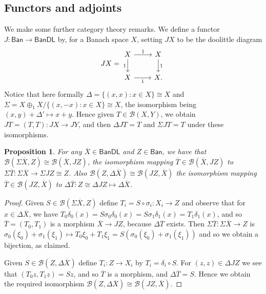 \documentclass[a4paper,11pt]{article}
\theoremstyle{plain}
\newtheorem{proposition}{Proposition}[section]
\theoremstyle{remark}
\newcommand{\mc}[1]{\mathcal{#1}}
\newcommand{\msf}[1]{\mathsf{#1}}
\begin{document}
\subsection{Functors and adjoints}\label{sec:functors_adjoints}

We make some further category theory remarks.  We define a functor $J\colon \msf{Ban} \to \msf{BanDL}$ by, for a Banach space $X$, setting $JX$ to be the doolittle diagram
\[ JX = \begin{tikzcd}
X \arrow[r, "1"] \arrow[d, "1"'] & X \arrow[d, "1"] \\
X \arrow[r, "1"'] & X.
\end{tikzcd} \]
Notice that here formally $\Delta = \{ (x,x) : x\in X \} \cong X$ and $\Sigma = X\oplus_1 X / \{ (x,-x) : x\in X \} \cong X$, the isomorphism being $(x,y) +\Delta' \mapsto x+y$.  Hence given $T\in\mc B(X,Y)$, we obtain $JT =(T,T) \colon JX \to JY$, and then $\Delta JT = T$ and $\Sigma JT = T$ under these isomorphisms.

\begin{proposition}\label{prop:J_hom_space_adjoints}
For any $\overline X\in\msf{BanDL}$ and $Z\in\msf{Ban}$, we have that $\mc B(\Sigma\overline X, Z) \cong \mc B(\overline X, JZ)$, the isomorphism mapping $\overline T\in\mc B(\overline X, JZ)$ to $\Sigma\overline T \colon \Sigma\overline X \to \Sigma JZ\cong Z$.  Also $\mc B(Z, \Delta\overline X) \cong \mc B(JZ, \overline X)$ the isomorphism mapping $\overline T \in \mc B(JZ, \overline X)$ to $\Delta\overline T \colon Z \cong \Delta JZ \mapsto \Delta\overline X$.
\end{proposition}
\begin{proof}
Given $S\in\mc B(\Sigma\overline X, Z)$ define $T_i = S\circ \sigma_i \colon X_i \to Z$ and observe that for $x\in\Delta\overline X$, we have $T_0\delta_0(x) = S \sigma_0\delta_0(x) = S\sigma_1\delta_1(x) = T_1\delta_1(x)$, and so $\overline T=(T_0,T_1)$ is a morphism $\overline X \to JZ$, because $\Delta\overline T$ exists.  Then $\Sigma\overline T \colon \Sigma\overline X \to Z$ is $\sigma_0(\xi_0) + \sigma_1(\xi_1) \mapsto T_0\xi_0 + T_1\xi_1 = S(\sigma_0(\xi_0) + \sigma_1(\xi_1))$ and so we obtain a bijection, as claimed.

Given $S\in\mc B(Z,\Delta\overline X)$ define $T_i\colon Z\to X_i$ by $T_i = \delta_i\circ S$.  For $(z,z)\in \Delta JZ$ we see that $(T_0z, T_1z) = Sz$, and so $\overline T$ is a morphism, and $\Delta\overline T = S$.  Hence we obtain the required isomorphism $\mc B(Z, \Delta\overline X) \cong \mc B(JZ, \overline X)$.
\end{proof}
\end{document}
